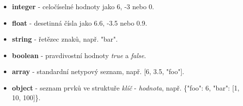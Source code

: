 \documentclass[10pt,titlepage,a4paper]{extarticle}
\begin{document}
\begin{itemize}
    \item
    \textbf{integer} - celočíselné hodnoty jako 6, -3 nebo 0.

    \item
    \textbf{float} - desetinná čísla jako 6.6, -3.5 nebo 0.9.

    \item
    \textbf{string} - řetězec znaků, např. "bar".

    \item
    \textbf{boolean} - pravdivostní hodnoty \textit{true} a \textit{false}.

    \item
    \textbf{array} - standardní netypový seznam, např. [6, 3.5, "foo"].

    \item
    \textbf{object} - seznam prvků ve struktuře \textit{klíč} - \textit{hodnota}, např. \{"foo": 6, "bar": [1, 10, 100]\}.
\end{itemize}
\end{document}
